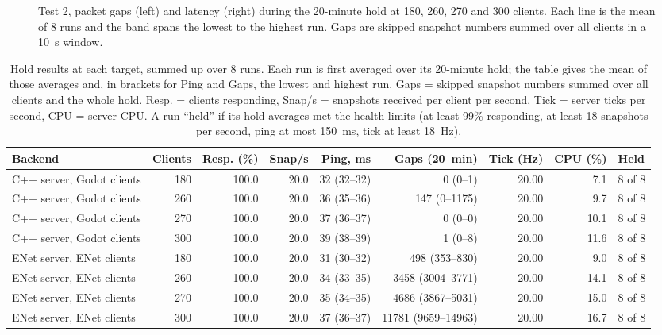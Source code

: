 \begin{figure}[!htbp]
\caption{Test 2, packet gaps (left) and latency (right) during the 20-minute hold at 180, 260, 270 and 300 clients. Each line is the mean of 8 runs and the band spans the lowest to the highest run. Gaps are skipped snapshot numbers summed over all clients in a 10~s window.}
\label{fig:holdall}
\end{figure}

\begin{table}[H]
\centering
\footnotesize
\setlength{\tabcolsep}{2pt}
\begin{tabular}{@{}lrrrrrrrl@{}}
\toprule
Backend & Clients & Resp. (\%) & Snap/s & Ping, ms & Gaps (20~min) & Tick (Hz) & CPU (\%) & Held \\
\midrule
C++ server, Godot clients & 180 & 100.0 & 20.0 & 32 (32--32) & 0 (0--1) & 20.00 & 7.1 & 8 of 8 \\
C++ server, Godot clients & 260 & 100.0 & 20.0 & 36 (35--36) & 147 (0--1175) & 20.00 & 9.7 & 8 of 8 \\
C++ server, Godot clients & 270 & 100.0 & 20.0 & 37 (36--37) & 0 (0--0) & 20.00 & 10.1 & 8 of 8 \\
C++ server, Godot clients & 300 & 100.0 & 20.0 & 39 (38--39) & 1 (0--8) & 20.00 & 11.6 & 8 of 8 \\
\midrule
ENet server, ENet clients & 180 & 100.0 & 20.0 & 31 (30--32) & 498 (353--830) & 20.00 & 9.0 & 8 of 8 \\
ENet server, ENet clients & 260 & 100.0 & 20.0 & 34 (33--35) & 3458 (3004--3771) & 20.00 & 14.1 & 8 of 8 \\
ENet server, ENet clients & 270 & 100.0 & 20.0 & 35 (34--35) & 4686 (3867--5031) & 20.00 & 15.0 & 8 of 8 \\
ENet server, ENet clients & 300 & 100.0 & 20.0 & 37 (36--37) & 11781 (9659--14963) & 20.00 & 16.7 & 8 of 8 \\
\bottomrule
\end{tabular}
\caption{Hold results at each target, summed up over 8 runs. Each run is first averaged over its 20-minute hold; the table gives the mean of those averages and, in brackets for Ping and Gaps, the lowest and highest run. Gaps = skipped snapshot numbers summed over all clients and the whole hold. Resp. = clients responding, Snap/s = snapshots received per client per second, Tick = server ticks per second, CPU = server CPU. A run ``held'' if its hold averages met the health limits (at least 99\% responding, at least 18 snapshots per second, ping at most 150~ms, tick at least 18~Hz).}
\label{tab:holdsum}
\end{table}

